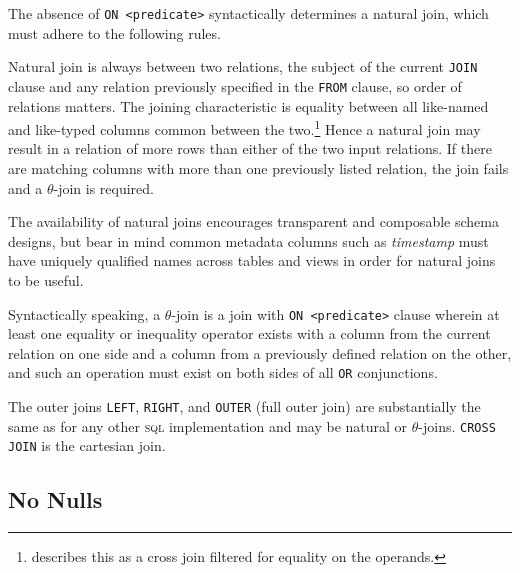 \documentclass[twoside]{article}
\begin{document}
The absence of \lstinline[style=inlinecode]{ON <predicate>} syntactically determines a natural join, which must adhere to the following rules.  

Natural join is always between two relations, the subject of the current \lstinline[style=inlinecode]{JOIN} clause and any relation previously specified in the \lstinline[style=inlinecode]{FROM} clause, so order of relations matters. The joining characteristic is equality between all like-named and like-typed columns common between the two.\footnote{\citet{Codd1970} describes this as a cross join filtered for equality on the operands.} Hence a natural join may result in a relation of more rows than either of the two input relations. If there are matching columns with more than one previously listed relation, the join fails and a $\theta$-join is required.

The availability of natural joins encourages transparent and composable schema designs, but bear in mind common metadata columns such as \emph{timestamp} must have uniquely qualified names across tables and views in order for natural joins to be useful.

\sloppy
Syntactically speaking, a $\theta$-join is a join with \lstinline[style=inlinecode]{ON <predicate>} clause wherein at least one equality or inequality operator exists with a column from the current relation on one side and a column from a previously defined relation on the other, and such an operation must exist on both sides of all \lstinline[style=inlinecode]{OR} conjunctions.

The outer joins \lstinline[style=inlinecode]{LEFT}, \lstinline[style=inlinecode]{RIGHT}, and \lstinline[style=inlinecode]{OUTER} (full outer join) are substantially the same as for any other \textsc{sql} implementation and may be natural or $\theta$-joins.  \lstinline[style=inlinecode]{CROSS JOIN} is the cartesian join.

\subsection{No Nulls}
\end{document}
